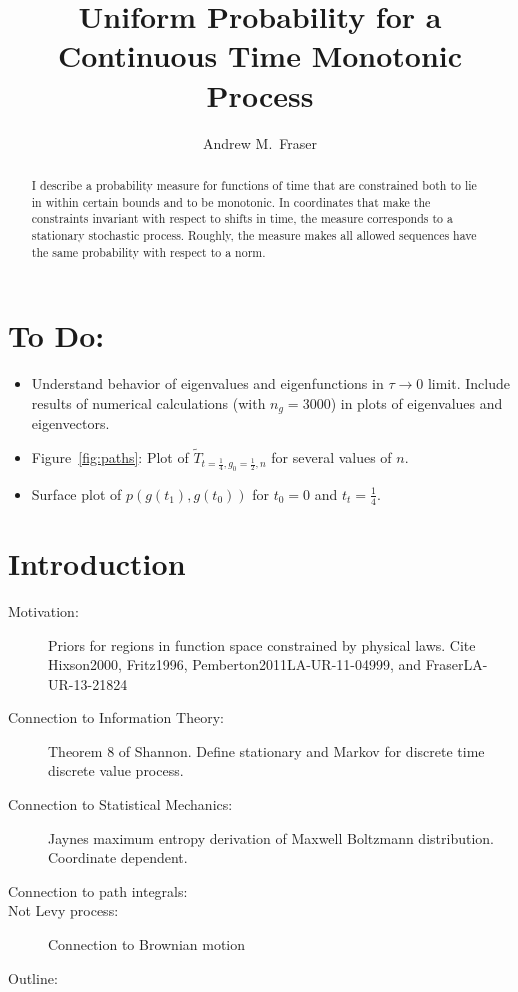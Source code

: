 \documentclass[12pt]{article} \usepackage{amsmath,amsfonts}
\title{Uniform Probability for a Continuous Time Monotonic Process }
\author{Andrew M.\ Fraser}
\begin{document}
\maketitle
\begin{abstract}
  I describe a probability measure for functions of time that are
  constrained both to lie in within certain bounds and to be
  monotonic.  In coordinates that make the constraints invariant with
  respect to shifts in time, the measure corresponds to a stationary
  stochastic process.  Roughly, the measure makes all allowed
  sequences have the same probability with respect to a norm.
\end{abstract}

\section*{To Do:}
\label{sec:do}

\begin{itemize}
\item Understand behavior of eigenvalues and eigenfunctions in
  $\tau \rightarrow 0$ limit.  Include results of numerical
  calculations (with $n_g=3000$) in plots of eigenvalues and
  eigenvectors.
\item Figure~\ref{fig:paths}: Plot of
  $\tilde T_{t=\frac{1}{4},g_0=\frac{1}{2},n}$ for several values of
  $n$.
\item Surface plot of $p(g(t_1),g(t_0))$ for $t_0=0$ and
  $t_t=\frac{1}{4}$.
\end{itemize}

\section{Introduction}
\label{sec:introduction}
\begin{description}
\item[Motivation:] Priors for regions in function space constrained by
  physical laws.  Cite Hixson2000, Fritz1996,
  Pemberton2011LA-UR-11-04999, and FraserLA-UR-13-21824
\item[Connection to Information Theory:] Theorem 8 of Shannon.  Define
  stationary and Markov for discrete time discrete value process.
\item[Connection to Statistical Mechanics:] Jaynes maximum entropy
  derivation of Maxwell Boltzmann distribution.  Coordinate dependent.
\item[Connection to path integrals:]
\item[Not Levy process:] Connection to Brownian motion
\item[Outline:]
\end{description}
\end{document}
